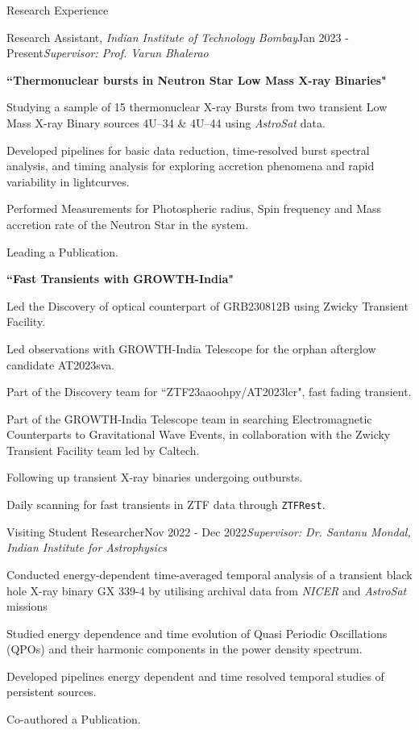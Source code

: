 \begin{rSection}{Research Experience}
\begin{rSubsection}{Research Assistant, \textit{Indian Institute of Technology Bombay}}{Jan 2023 - Present}{\emph{Supervisor: Prof. Varun Bhalerao}}{}
\item[]  \hspace{-1em} \textbf{``Thermonuclear bursts in Neutron Star Low Mass X-ray Binaries"}
\item Studying a sample of 15 thermonuclear X-ray Bursts from two transient Low Mass X-ray Binary sources 4U--34 \& 4U--44 using \textit{AstroSat} data.
\item Developed pipelines for basic data reduction, time-resolved burst spectral analysis, and timing analysis for exploring accretion phenomena and rapid variability in lightcurves.
\item Performed Measurements for Photospheric radius, Spin frequency and Mass accretion rate of the Neutron Star in the system.
\item Leading a Publication. \\
\item[]  \hspace{-1em} \textbf{``Fast Transients with GROWTH-India"}
\item Led the Discovery of optical counterpart of GRB230812B using Zwicky Transient Facility.
\item Led observations with GROWTH-India Telescope for the orphan afterglow candidate AT2023sva.
\item Part of the Discovery team for ``ZTF23aaoohpy/AT2023lcr", fast fading transient.
\item Part of the GROWTH-India Telescope team in searching Electromagnetic Counterparts to Gravitational Wave Events, in collaboration with the Zwicky Transient Facility team led by Caltech.
\item Following up transient X-ray binaries undergoing outbursts.
\item Daily scanning for fast transients in ZTF data through \texttt{ZTFRest}.
\end{rSubsection}

\vspace{0.1em}

\begin{rSubsection}{Visiting Student Researcher}{Nov 2022 - Dec 2022}{\emph{Supervisor: Dr. Santanu Mondal, Indian Institute for Astrophysics}}{}
\item Conducted energy-dependent time-averaged temporal analysis of a transient black hole X-ray binary GX 339-4 by utilising archival data from \textit{NICER} and \textit{AstroSat} missions 
\item Studied energy dependence and time evolution of Quasi Periodic Oscillations (QPOs) and their harmonic
components in the power density spectrum.
\item Developed pipelines energy dependent and time resolved temporal studies of persistent sources. 
\item Co-authored a Publication.
\end{rSubsection}
\end{rSection}
